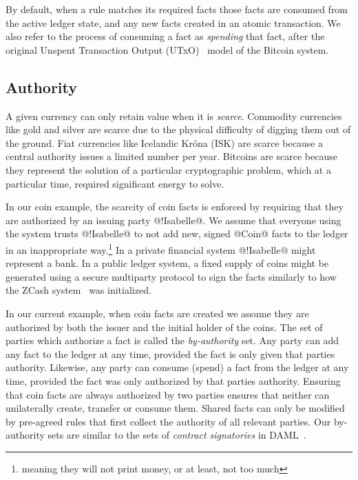 By default, when a rule matches its required facts those facts are consumed from the active ledger state, and any new facts created in an atomic transaction. We also refer to the process of consuming a fact as \emph{spending} that fact, after the original Unspent Transaction Output (UTxO)~\cite{Zahnentferner2018:UTxO} model of the Bitcoin system.



\subsection{Authority}
\label{s:FactAuthority}
A given currency can only retain value when it is \emph{scarce}. Commodity currencies like gold and silver are scarce due to the physical difficulty of digging them out of the ground. Fiat currencies like Icelandic Kr\'ona (ISK) are scarce because a central authority issues a limited number per year. Bitcoins are scarce because they represent the solution of a particular cryptographic problem, which at a particular time, required significant energy to solve.

In our coin example, the scarcity of coin facts is enforced by requiring that they are authorized by an issuing party @!Isabelle@. We assume that everyone using the system trusts @!Isabelle@ to not add new, signed @Coin@ facts to the ledger in an inappropriate way.\footnote{meaning they will not print money, or at least, not too much} In a private financial system @!Isabelle@ might represent a bank. In a public ledger system, a fixed supply of coins might be generated using a secure multiparty protocol to sign the facts similarly to how the ZCash system~\cite{Bowe2018:MultiParty, Hopwood2016:zcash} was initialized.

In our current example, when coin facts are created we assume they are authorized by both the issuer and the initial holder of the coins. The set of parties which authorize a fact is called the \emph{by-authority} set. Any party can add any fact to the ledger at any time, provided the fact is only given that parties authority. Likewise, any party can consume (spend) a fact from the ledger at any time, provided the fact was only authorized by that parties authority. Ensuring that coin facts are always authorized by two parties ensures that neither can unilaterally create, transfer or consume them. Shared facts can only be modified by pre-agreed rules that first collect the authority of all relevant parties. Our by-authority sets are similar to the sets of \emph{contract signatories} in DAML~\cite{DA2019:DAML}.

